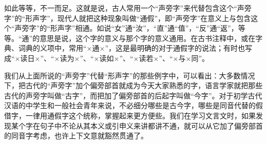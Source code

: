 如此等等，不一而足。这就是说，古人常用一个“声旁字”来代替包含这个“声旁字”的“形声字”，现代人就把这种现象叫做“通假”，即“声旁字”在意义上与包含这个“声旁字”的“形声字”相通。如说“女”通“汝”，“直”通“值”，“反”通“返”，等等。“通”的意思是说，这个字的意义与那个字的意义通用。在古书注释中，或在字典、词典的义项中，常用“×通×”，这是最明确的对于通假字的说法；有时也写成“×读日×”、“×读为×”、“×读如×”、“×读若×”、“×与×同”。

我们从上面所说的“声旁字”代替“形声字”的那些例字中，可以看出：大多数情况下，把古代的“声旁字”加个偏旁部首就成为今天大家熟悉的字，语言学家就把那些古代的声旁字叫做“古字”，而把加了偏旁部首的后起字叫做“今字”。对于初学古代汉语的中学生和一般社会青年来说，不必细分哪些是古今字，哪些是同音代替的假借字，一律用通假字这个统称，掌握起来更方便些。我们在学习文言文时，如果发现某个字在句子中不论从其本义或引申义来讲都讲不通，就可以从它加了偏旁部首的同音字考虑，也许上下文意就豁然贯通了。

